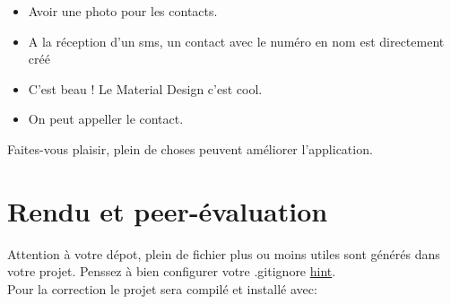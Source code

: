 \documentclass{42}
\begin{document}
	\begin{itemize}\itemsep1pt
		\item Avoir une photo pour les contacts.
		\item A la r\'eception d'un sms, un contact avec le num\'ero en nom est directement cr\'e\'e
		\item C'est beau ! Le Material Design c'est cool.
		\item On peut appeller le contact.
	\end{itemize}
	\vspace{10mm}
	Faites-vous plaisir, plein de choses peuvent am\'eliorer l'application.

\chapter{Rendu et peer-\'evaluation}

	Attention \`a votre d\'epot, plein de fichier plus ou moins utiles sont
	g\'en\'er\'es dans votre projet. Penssez \`a bien configurer votre
	.gitignore \href{https://www.gitignore.io}{hint}.\\
	
	\vspace{5mm}
	Pour la correction le projet sera compil\'e et install\'e avec:\\
\end{document}
